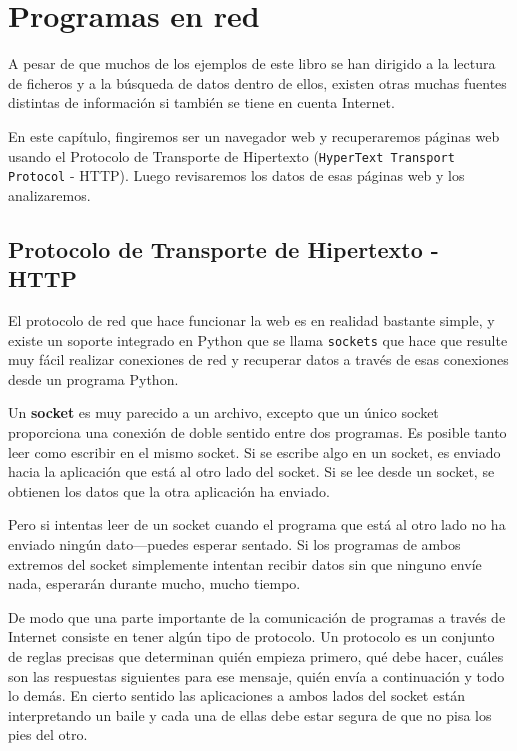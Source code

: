 
\chapter{Programas en red}

A pesar de que muchos de los ejemplos de este libro se han dirigido a la lectura
de ficheros y a la búsqueda de datos dentro de ellos, existen otras muchas fuentes
distintas de información si también se tiene en cuenta Internet.

En este capítulo, fingiremos ser un navegador web y recuperaremos páginas
web usando el Protocolo de Transporte de Hipertexto ({\tt HyperText Transport Protocol} - HTTP).
Luego revisaremos los datos de esas páginas web y los analizaremos.

\section{Protocolo de Transporte de Hipertexto - HTTP}

El protocolo de red que hace funcionar la web es en realidad bastante simple, y
existe un soporte integrado en Python que se llama {\tt sockets} que hace que resulte muy
fácil realizar conexiones de red y recuperar datos a través de esas
conexiones desde un programa Python.

Un {\bf socket} es muy parecido a un archivo, excepto que un único socket
proporciona una conexión de doble sentido entre dos programas.
Es posible tanto leer como escribir en el mismo socket. Si se escribe algo en
un socket, es enviado hacia la aplicación que está al otro lado del socket. Si se lee
desde un socket, se obtienen los datos que la otra aplicación ha enviado.

Pero si intentas leer de un socket cuando el programa que está al otro lado
no ha enviado ningún dato---puedes esperar sentado. Si los programas de ambos extremos
del socket simplemente intentan recibir datos sin que ninguno envíe nada, esperarán durante mucho,
mucho tiempo.

De modo que una parte importante de la comunicación de programas a través de Internet consiste en tener algún
tipo de protocolo. Un protocolo es un conjunto de reglas precisas que determinan quién
empieza primero, qué debe hacer, cuáles son las respuestas siguientes para ese mensaje,
quién envía a continuación y todo lo demás. En cierto sentido las aplicaciones a ambos lados del
socket están interpretando un baile y cada una de ellas debe estar segura de que no pisa
los pies del otro.

